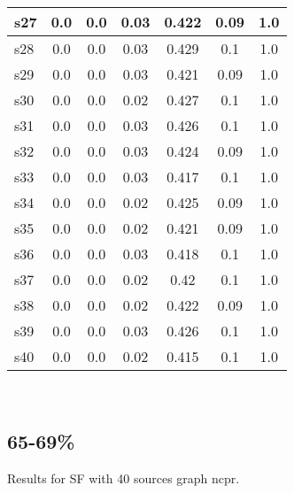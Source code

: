 \documentclass{article}
\begin{document}
\begin{tabular}{|l|c|c|c|c|c|c|}
\hline
s27 &0.0 & 0.0 & 0.03 & 0.422 & 0.09 & 1.0\\
\hline
s28 &0.0 & 0.0 & 0.03 & 0.429 & 0.1 & 1.0\\
\hline
s29 &0.0 & 0.0 & 0.03 & 0.421 & 0.09 & 1.0\\
\hline
s30 &0.0 & 0.0 & 0.02 & 0.427 & 0.1 & 1.0\\
\hline
s31 &0.0 & 0.0 & 0.03 & 0.426 & 0.1 & 1.0\\
\hline
s32 &0.0 & 0.0 & 0.03 & 0.424 & 0.09 & 1.0\\
\hline
s33 &0.0 & 0.0 & 0.03 & 0.417 & 0.1 & 1.0\\
\hline
s34 &0.0 & 0.0 & 0.02 & 0.425 & 0.09 & 1.0\\
\hline
s35 &0.0 & 0.0 & 0.02 & 0.421 & 0.09 & 1.0\\
\hline
s36 &0.0 & 0.0 & 0.03 & 0.418 & 0.1 & 1.0\\
\hline
s37 &0.0 & 0.0 & 0.02 & 0.42 & 0.1 & 1.0\\
\hline
s38 &0.0 & 0.0 & 0.02 & 0.422 & 0.09 & 1.0\\
\hline
s39 &0.0 & 0.0 & 0.03 & 0.426 & 0.1 & 1.0\\
\hline
s40 &0.0 & 0.0 & 0.02 & 0.415 & 0.1 & 1.0\\
\hline
\end{tabular}\\

\newpage

\subsection{65-69\%}

\noindent Results for SF with 40 sources graph ncpr.
\end{document}
